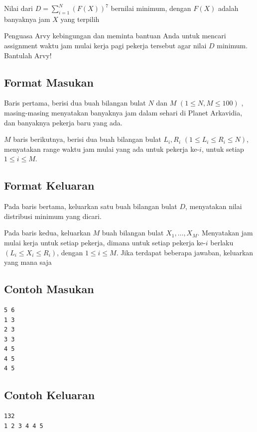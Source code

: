 \documentclass{article}
\begin{document}
\begin{center}
Nilai dari $D = \sum_{i = 1}^{N} (F(X))^7$ bernilai minimum, dengan $F(X)$ adalah banyaknya jam $X$ yang terpilih
\end{center}

Penguasa Arvy kebingungan dan meminta bantuan Anda untuk mencari assignment waktu jam mulai kerja pagi pekerja tersebut agar nilai $D$ minimum. Bantulah Arvy!

\subsection*{Format Masukan}

Baris pertama, berisi dua buah bilangan bulat $N$ dan $M$ $(1 \leq N, M \leq 100)$ , masing-masing menyatakan banyaknya jam dalam sehari di Planet Arkavidia, dan banyaknya pekerja baru yang ada.

$M$ baris berikutnya, berisi dua buah bilangan bulat $L_i, R_i$ $(1 \leq L_i \leq R_i \leq N)$, menyatakan range waktu jam mulai yang ada untuk pekerja ke-$i$, untuk setiap $1 \leq i \leq M$.

\subsection*{Format Keluaran}

Pada baris bertama, keluarkan satu buah bilangan bulat $D$, menyatakan nilai distribusi minimum yang dicari.

Pada baris kedua, keluarkan $M$ buah bilangan bulat $X_1, \dots, X_M$. Menyatakan jam mulai kerja untuk setiap pekerja, dimana untuk setiap pekerja ke-$i$ berlaku $(L_i \leq X_i \leq R_i)$, dengan $1 \leq i \leq M$. Jika terdapat beberapa jawaban, keluarkan yang mana saja

\begin{multicols}{2}
\subsection*{Contoh Masukan}
\begin{lstlisting}
5 6
1 3
2 3
3 3
4 5
4 5
4 5

\end{lstlisting}
\columnbreak
\subsection*{Contoh Keluaran}
\begin{lstlisting}
132
1 2 3 4 4 5
\end{lstlisting}
\vfill
\null
\end{multicols}
\end{document}

